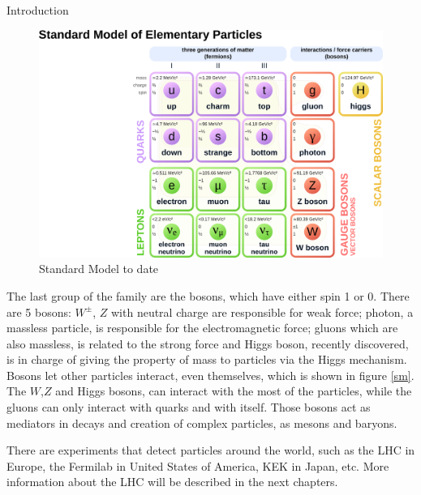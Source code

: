 \begin{chapter}{Introduction}
\begin{center}
  \begin{figure}[ht]
    \centering
    \includegraphics[scale=0.3]{Chapter1/sm1.png}
    \caption[Standard Model to date]{Standard Model to date\cite{smtable}}
    \label{sm1}
  \end{figure}
\end{center}
The last group of the family are the bosons, which have either spin 1 or 0. 
There are 5 bosons: $W^{\pm}$, $Z$ with neutral charge are responsible for weak force; photon, a massless particle, is responsible for the electromagnetic force; gluons which are also massless, is related to the strong force and Higgs boson, recently discovered, is in charge of giving the property of mass to particles via the Higgs mechanism. Bosons let other particles interact, even themselves, which is shown in figure \ref{sm}. 
The $W$,$Z$ and Higgs bosons, can interact with the most of the particles, while the gluons can only interact with quarks and with itself.
Those bosons act as mediators in decays and creation of complex
particles, as mesons and baryons.

There are experiments that detect particles around the world, such as the LHC in Europe, the Fermilab in United States of America, KEK in Japan, etc. More information about the LHC will be described in the next chapters. 


\end{chapter}
